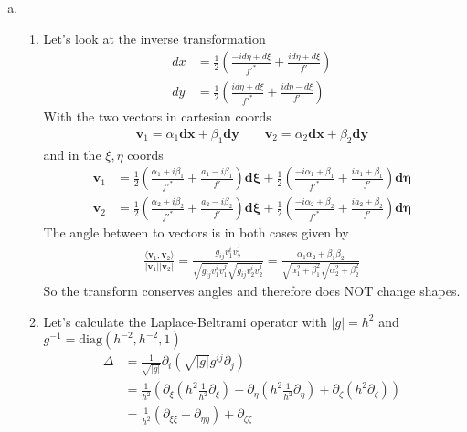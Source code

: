 \documentclass[../main.tex]{subfiles}
\begin{document}
\begin{enumerate}[a.]
\item 
\begin{enumerate}
\item Let's look at the inverse transformation
\begin{align}
dx&=\frac{1}{2}(\frac{-id\eta+d\xi}{f'^*}+\frac{id\eta+d\xi}{f'})\\
dy&=\frac{1}{2}(\frac{id\eta+d\xi}{f'^*}+\frac{id\eta-d\xi}{f'})
\end{align} 
With the two vectors in cartesian coords
\begin{align}
\mathbf{v}_1=\alpha_1\mathbf{dx}+\beta_1\mathbf{dy}\qquad 
\mathbf{v}_2=\alpha_2\mathbf{dx}+\beta_2\mathbf{dy}
\end{align}
and in the $\xi,\eta$ coords
\begin{align}
\mathbf{v}_1&=\frac{1}{2}\left(\frac{\alpha_1+i\beta_1}{f'^*}+\frac{a_1-i\beta_1}{f'}\right)\mathbf{d\xi}+\frac{1}{2}\left(\frac{-i\alpha_1+\beta_1}{f'^*}+\frac{ia_1+\beta_1}{f'}\right)\mathbf{d\eta}\\
\mathbf{v}_2&=\frac{1}{2}\left(\frac{\alpha_2+i\beta_2}{f'^*}+\frac{a_2-i\beta_2}{f'}\right)\mathbf{d\xi}+\frac{1}{2}\left(\frac{-i\alpha_2+\beta_2}{f'^*}+\frac{ia_2+\beta_2}{f'}\right)\mathbf{d\eta}\end{align}
The angle between to vectors is in both cases given by
\begin{align}
\frac{\langle \mathbf{v}_1,\mathbf{v}_2\rangle}{|\mathbf{v}_1||\mathbf{v}_2|}
=\frac{g_{ij}v_1^iv_2^j}{\sqrt{g_{ij}v_1^iv_1^j}\sqrt{g_{ij}v_2^iv_2^j}}
=\frac{\alpha_1\alpha_2+\beta_1\beta_2}{\sqrt{\alpha_1^2+\beta_1^2}\sqrt{\alpha_2^2+\beta_2^2}}
\end{align}
So the transform conserves angles and therefore does NOT change shapes.


\item Let's calculate the Laplace-Beltrami operator with $|g|=h^2$ and $g^{-1}=\text{diag}(h^{-2},h^{-2},1)$
\begin{align}
\Delta&=\frac{1}{\sqrt{|g|}}\partial_i\left(\sqrt{|g|}g^{ij}\partial_j\right)\\
&=\frac{1}{h^2}\left(
\partial_\xi(h^2\frac{1}{h^2}\partial_\xi)+
\partial_\eta(h^2\frac{1}{h^2}\partial_\eta)+
\partial_\zeta(h^2\partial_\zeta)
\right)\\
&=\frac{1}{h^2}(\partial_{\xi\xi}+\partial_{\eta\eta})+\partial_{\zeta\zeta}
\end{align}
\end{enumerate}
\end{enumerate}
\end{document}
